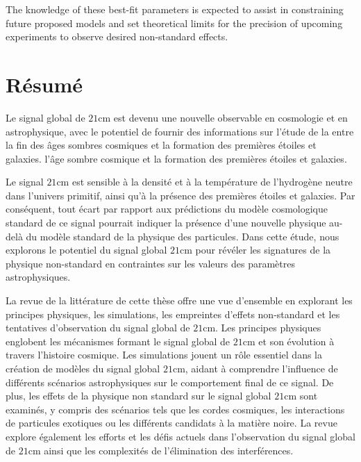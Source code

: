\documentclass[12pt, TexShade, letterpaper]{report}
\begin{document}
The knowledge of these best-fit parameters is expected to assist in constraining future proposed models and set theoretical limits for the precision of upcoming experiments to observe desired non-standard effects.\par
\chapter*{Résumé}
	\label{chap:frAbstract}
Le signal global de $\mathrm{21cm}$ est devenu une nouvelle observable en cosmologie et en astrophysique, avec le potentiel de fournir des informations sur l'étude de la  entre la fin des âges sombres cosmiques et la formation des premières étoiles et galaxies. l'âge sombre cosmique et la formation des premières étoiles et galaxies.\par

Le signal $\mathrm{21cm}$ est sensible à la densité et à la température de l'hydrogène neutre dans l'univers primitif, ainsi qu'à la présence des premières étoiles et galaxies. Par conséquent, tout écart par rapport aux prédictions du modèle cosmologique standard de ce signal pourrait indiquer la présence d'une nouvelle physique au-delà du modèle standard de la physique des particules. Dans cette étude, nous explorons le potentiel du signal global $\mathrm{21cm}$ pour révéler les signatures de la physique non-standard en contraintes sur les valeurs des paramètres astrophysiques.\par

La revue de la littérature de cette thèse offre une vue d'ensemble en explorant les principes physiques, les simulations, les empreintes d'effets non-standard et les tentatives d'observation du signal global de $\mathrm{21cm}$. Les principes physiques englobent les mécanismes formant le signal global de $\mathrm{21cm}$ et son évolution à travers l'histoire cosmique. Les simulations jouent un rôle essentiel dans la création de modèles du signal global $\mathrm{21cm}$, aidant à comprendre l'influence de différents scénarios astrophysiques sur le comportement final de ce signal. De plus, les effets de la physique non standard sur le signal global $\mathrm{21cm}$ sont examinés, y compris des scénarios tels que les cordes cosmiques, les interactions de particules exotiques ou les différents candidats à la matière noire. La revue explore également les efforts et les défis actuels dans l'observation du signal global de $\mathrm{21cm}$ ainsi que les complexités de l'élimination des interférences.\par
\end{document}
